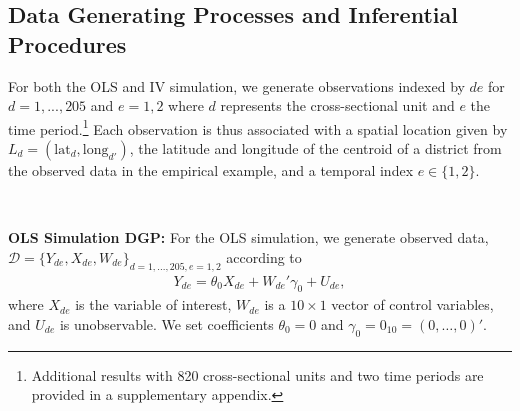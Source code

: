 \documentclass[preprint]{imsart}
\numberwithin{equation}{section}
\theoremstyle{plain}
\theoremstyle{definition}
\renewcommand{\(}{\left(}
\renewcommand{\)}{\right)}
\renewcommand{\[}{\left[}
\renewcommand{\]}{\right]}
\begin{document}
\subsection{Data Generating Processes and Inferential Procedures}
\label{subsec: DGP}

For both the OLS and IV simulation, we generate observations indexed by $de$ for $d = 1,...,205$ and $e = 1,2$ where $d$ represents the cross-sectional unit and $e$ the time period.\footnote{Additional results with 820 cross-sectional units and two time periods are provided in a supplementary appendix.} Each observation is thus associated with a spatial location given by $L_d = (\mathrm{lat}_d, \mathrm{long}_{d'})$, the latitude and longitude of the centroid of a district from the observed data in the empirical example, and a temporal index $e \in \{1,2\}$.

\

\noindent
\textbf{OLS Simulation DGP:} For the OLS simulation, we generate observed data, $\mathscr D = \{ Y_{de}, X_{de}, W_{de} \}_{d=1,...,205, e=1,2}$ according to 
\begin{align}\label{eq: OLS sim}
Y_{de} = \theta_0 X_{de} + W_{de}'\gamma_0 + U_{de},
\end{align}
where $X_{de}$ is the variable of interest, $W_{de}$ is a $10 \times 1$ vector of control variables, and $U_{de}$ is unobservable. We set coefficients $\theta_0=0$ and $\gamma_0=0_{10}=(0,\dots,0)'$. 
\end{document}
